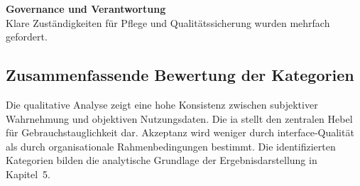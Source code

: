 \textbf{Governance und Verantwortung} \\
Klare Zuständigkeiten für Pflege und Qualitätssicherung wurden mehrfach gefordert.

\subsection{Zusammenfassende Bewertung der Kategorien}

Die qualitative Analyse zeigt eine hohe Konsistenz zwischen subjektiver Wahrnehmung und objektiven Nutzungsdaten. Die \Gls{ia} stellt den zentralen Hebel für Gebrauchstauglichkeit dar. Akzeptanz wird weniger durch \Gls{interface}-Qualität als durch organisationale Rahmenbedingungen bestimmt. Die identifizierten Kategorien bilden die analytische Grundlage der Ergebnisdarstellung in Kapitel~5.